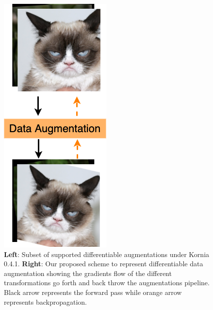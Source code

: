 \begin{figure}
\begin{minipage}[b]{0.25\linewidth}
    \includegraphics[width=.8\linewidth, right]{main/chapter03/data/dda/imgs/dda.png}
    \par\vspace{0pt}
  \end{minipage}%
\caption[Supported differentiable augmentations in Kornia]{{\bf Left}: Subset of supported differentiable augmentations under Kornia 0.4.1. {\bf Right}: Our proposed scheme to represent differentiable data augmentation showing the gradients flow of the different transformations go forth and back throw the augmentations pipeline. Black arrow represents the forward pass while orange arrow represents backpropagation.}
\label{fig:test}
\end{figure}

